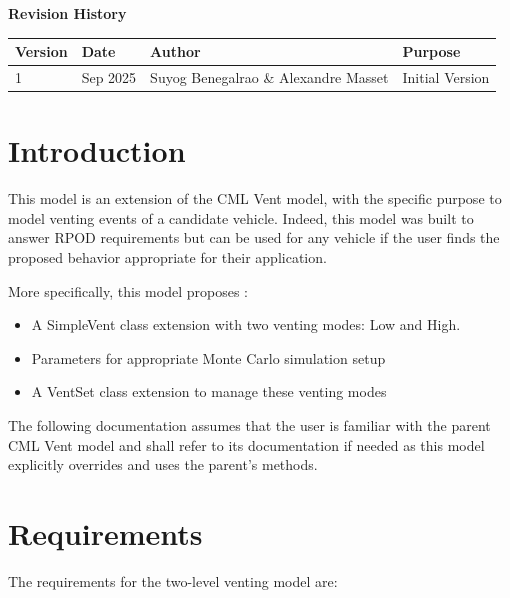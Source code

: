 \documentclass[11pt,fleqn]{report}
\begin{document}
\pagestyle{empty}
\titlePage
{}
\tableofcontents %
\vfill
\pagebreak
{\Large \textbf {Revision History}}
{\large
\begin{center}
\begin{tabular}{|l||l|l|l|}
\hline
 \textbf{Version} & \textbf{Date} & \textbf{Author} & \textbf{Purpose} \\ \hline \hline
1 & Sep 2025 & Suyog Benegalrao \& Alexandre Masset & Initial Version \\ \hline
\end{tabular}
\end{center}
}

\chapter{Introduction} %
\noindent 
This model is an extension of the CML Vent model, with the specific purpose to model venting events
of a candidate vehicle. Indeed, this model was built to answer RPOD requirements but can be used for any
vehicle if the user finds the proposed behavior appropriate for their application.

More specifically, this model proposes :
\begin{itemize}
    \item A SimpleVent class extension with two venting modes: Low and High.
    \item Parameters for appropriate Monte Carlo simulation setup
    \item A VentSet class extension to manage these venting modes
\end{itemize}

The following documentation assumes that the user is familiar with the parent CML Vent model and shall
refer to its documentation if needed as this model explicitly overrides and uses the parent's methods.

\chapter{Requirements}
\noindent The requirements for the two-level venting model are:
\end{document}
